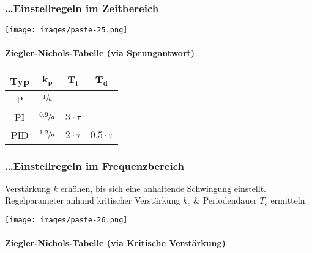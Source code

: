 \documentclass[
  10pt,
  a4paper,
  twocolumn]{article}
\let\oldparagraph\paragraph
\renewcommand{\paragraph}[1]{\oldparagraph{#1}\mbox{}}
\numberwithin{equation}{section}
\let\paragraph\oldparagraph
\renewcommand{\paragraph}[1]{\oldparagraph{#1}\mbox{}\par}
\begin{document}
\subsubsection{\ldots Einstellregeln im
Zeitbereich}\label{einstellregeln-im-zeitbereich}

\begin{center}
\texttt{[image: images/paste-25.png]}
\end{center}

\paragraph{Ziegler-Nichols-Tabelle (via
Sprungantwort)}\label{ziegler-nichols-tabelle-via-sprungantwort}

\def\arraystretch{1.2}
\begin{center}
    \begin{tabular}{cccc}
        \hline
        \textbf{Typ} & $\mathbf{k_p}$ & $\mathbf{T_i}$ & $\mathbf{T_d}$ \\
        \hline
        P   & $\sfrac{1}{a}$   & $-$          & $-$            \\
        PI  & $\sfrac{0.9}{a}$ & $3\cdot\tau$ & $-$            \\
        PID & $\sfrac{1.2}{a}$ & $2\cdot\tau$ & $0.5\cdot\tau$ \\
    \end{tabular}
\end{center}

\subsubsection{\ldots Einstellregeln im
Frequenzbereich}\label{einstellregeln-im-frequenzbereich}

Verstärkung \(k\) erhöhen, bis sich eine anhaltende Schwingung
einstellt. Regelparameter anhand kritischer Verstärkung \(k_c\) \&
Periodendauer \(T_c\) ermitteln.

\begin{center}
\texttt{[image: images/paste-26.png]}
\end{center}

\paragraph{Ziegler-Nichols-Tabelle (via Kritische
Verstärkung)}\label{ziegler-nichols-tabelle-via-kritische-verstuxe4rkung}
\end{document}
